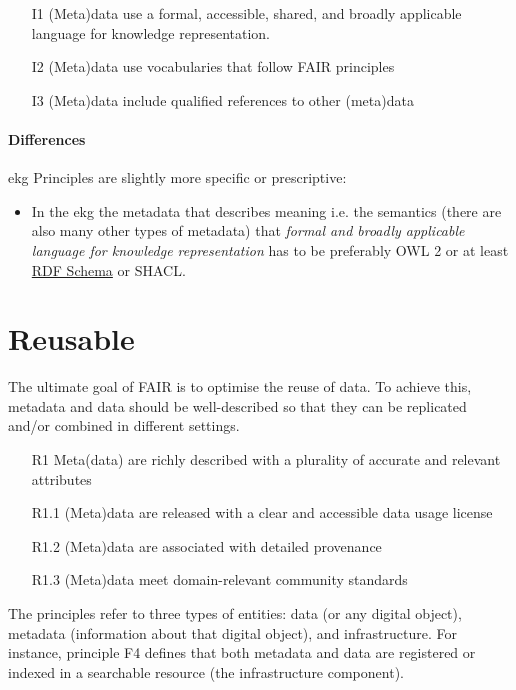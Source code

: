 \begin{itemize}
    \item[I1] (Meta)data use a formal, accessible, shared, and broadly applicable language for knowledge representation.
    \item[I2] (Meta)data use vocabularies that follow FAIR principles
    \item[I3] (Meta)data include qualified references to other (meta)data
\end{itemize}

\paragraph{Differences}

\gls{ekg} Principles are slightly more specific or prescriptive:

\begin{itemize}
    \item In the \gls{ekg} the metadata that describes meaning i.e. the semantics
          (there are also many other types of metadata) that
          \textit{formal and broadly applicable language for knowledge representation}
          has to be preferably OWL 2 or at least \href{https://www.w3.org/TR/rdf-schema/}{RDF Schema} or SHACL.
\end{itemize}


\section{Reusable}

The ultimate goal of FAIR is to optimise the reuse of data.
To achieve this, metadata and data should be well-described so that they can be replicated and/or
combined in different settings.

\begin{itemize}
    \item[R1] Meta(data) are richly described with a plurality of accurate and relevant attributes
    \item[R1.1] (Meta)data are released with a clear and accessible data usage license
    \item[R1.2] (Meta)data are associated with detailed provenance
    \item[R1.3] (Meta)data meet domain-relevant community standards
\end{itemize}

The principles refer to three types of entities: data (or any digital object),
metadata (information about that digital object), and infrastructure.
For instance, principle F4 defines that both metadata and data are registered or indexed in a
searchable resource (the infrastructure component).

